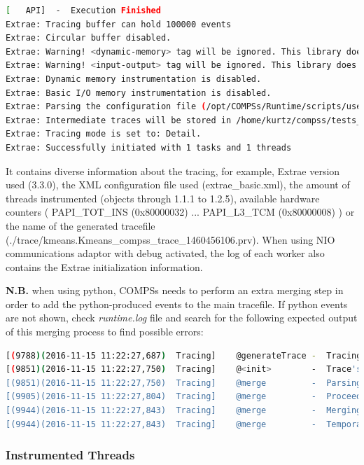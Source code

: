 \begin{lstlisting}[language=bash]
[   API]  -  Execution Finished
Extrae: Tracing buffer can hold 100000 events
Extrae: Circular buffer disabled.
Extrae: Warning! <dynamic-memory> tag will be ignored. This library does support instrumenting dynamic memory calls.
Extrae: Warning! <input-output> tag will be ignored. This library does support instrumenting I/O calls.
Extrae: Dynamic memory instrumentation is disabled.
Extrae: Basic I/O memory instrumentation is disabled.
Extrae: Parsing the configuration file (/opt/COMPSs/Runtime/scripts/user/../../configuration/xml/tracing/extrae_basic.xml) has ended
Extrae: Intermediate traces will be stored in /home/kurtz/compss/tests_local/app10
Extrae: Tracing mode is set to: Detail.
Extrae: Successfully initiated with 1 tasks and 1 threads
\end{lstlisting}

It contains diverse information about the tracing, for example, Extrae version used (3.3.0), the XML configuration file used (extrae\_basic.xml), the amount of 
threads instrumented (objects through 1.1.1 to 1.2.5), available hardware counters ( PAPI\_TOT\_INS (0x80000032) ... PAPI\_L3\_TCM (0x80000008) ) or the name 
of the generated tracefile (./trace/kmeans.Kmeans\_compss\_trace\_1460456106.prv). When using NIO communications adaptor with debug activated, the log of each worker
also contains the Extrae initialization information.

\textbf{N.B.} when using python, COMPSs needs to perform an extra merging step in order to add the python-produced events to the main tracefile. If python events are not shown, check \textit{runtime.log} file and search for the following expected output of this merging process to find possible errors:

\begin{lstlisting}[language=bash]
[(9788)(2016-11-15 11:22:27,687)  Tracing]    @generateTrace -  Tracing: Generating trace
[(9851)(2016-11-15 11:22:27,750)  Tracing]    @<init>        -  Trace's merger initialization successful
[(9851)(2016-11-15 11:22:27,750)  Tracing]    @merge         -  Parsing master sync events
[(9905)(2016-11-15 11:22:27,804)  Tracing]    @merge         -  Proceeding to merge task traces into master
[(9944)(2016-11-15 11:22:27,843)  Tracing]    @merge         -  Merging finished,
[(9944)(2016-11-15 11:22:27,843)  Tracing]    @merge         -  Temporal task folder removed.
\end{lstlisting}


\subsubsection{Instrumented Threads}



